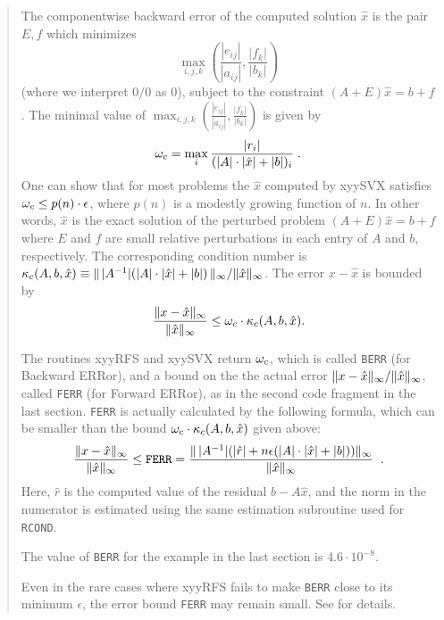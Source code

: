 \begin{quote}
The componentwise backward error
of the computed solution $\hat{x}$ is the pair $E,f$ which minimizes
\[
\max_{i,j,k} \left( \frac{| e_{ij} |}{|a_{ij}|} ,
            \frac{| f_{k} |}{|b_{k}|} \right)
\]
(where we interpret $0/0$ as 0),
subject to the constraint $(A+E) \hat{x} = b+f$.
The minimal value of $\max_{i,j,k} \left( \frac{| e_{ij} |}{|a_{ij}|} ,
\frac{| f_{k} |}{|b_{k}|} \right)$
is given by
\[
\omega_{c} = \max_i \frac{|r_i|}{ (|A| \cdot |\hat{x} | + |b|)_i} \; .
\]
One can show that for most problems the $\hat{x}$ computed by xyySVX
satisfies $\omega_{c} \leq p(n) \cdot \epsilon$,
where $p(n)$ is a modestly growing function of $n$.
In other words, $\hat{x}$ is the exact solution of the
perturbed problem $(A+ E ) \hat{x} = b + f$
where $E$ and $f$ are small relative perturbations in each entry of $A$ and
$b$, respectively.
The corresponding condition number is
$\kappa_{c} (A,b,\hat{x}) \equiv {\| \, |A^{-1}| ( |A| \cdot | \hat{x} | + |b| )
\, \|_{\infty}}/{\| \hat{x} \|_{\infty}}$.
The error $x-\hat{x}$ is bounded by
\[
\frac{\| x- \hat{x} \|_{\infty}}{\| \hat{x} \|_{\infty}}
\leq \omega_{c} \cdot \kappa_{c} (A,b,\hat{x})  .
\]

The routines xyyRFS and xyySVX return
$\omega_{c}$, which is called {\tt BERR}
(for Backward ERRor),
and a bound on the the actual error
$\|x - \hat{x}\|_{\infty} / \| \hat{x} \|_{\infty}$, called {\tt FERR}
(for Forward ERRor), as
in the second code fragment in the last section.
{\tt FERR} is actually calculated by the following formula, which can
be smaller than the bound $\omega_{c} \cdot \kappa_{c} (A,b,\hat{x})$ given above:
\[
\frac{\| x- \hat{x} \|_{\infty}}{\| \hat{x} \|_{\infty}} \leq {\tt FERR} =
\frac{\| \, |A^{-1}| ( |\hat{r}| + n \epsilon (|A| \cdot |\hat{x}| + |b|) )
\|_{\infty} } {\| \hat{x} \|_{\infty}}  \; \; .
\]
Here, $\hat{r}$ is the computed value of the residual $b-A \hat{x}$, and
the norm in the numerator is estimated using the same estimation
subroutine used for {\tt RCOND}.

The value of
{\tt BERR} for the example in the last section is $4.6 \cdot 10^{-8}$.

Even in the rare cases where xyyRFS fails to make
{\tt BERR} close to its minimum $\epsilon$, the error bound {\tt FERR}
may remain small. See \cite{ariolidemmelduff}
for details.
\end{quote}

